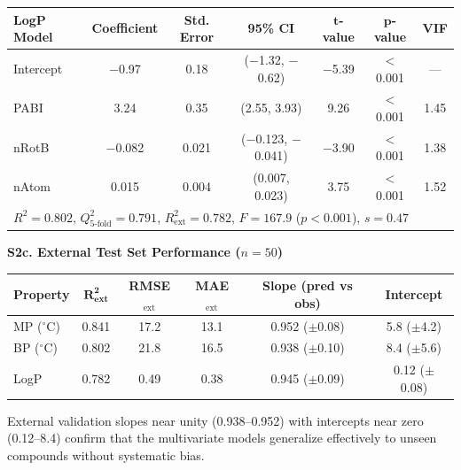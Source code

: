 \documentclass[12pt,a4paper]{article}
\begin{document}
\begin{table}[H]
\centering
\begin{tabular}{@{}lcccccc@{}}
\toprule
\textbf{LogP Model} & \textbf{Coefficient} & \textbf{Std. Error} & \textbf{95\% CI} & $\mathbf{t}$-\textbf{value} & $\mathbf{p}$-\textbf{value} & \textbf{VIF} \\
\midrule
Intercept & $-$0.97 & 0.18 & ($-$1.32, $-$0.62) & $-$5.39 & $<$0.001 & --- \\
PABI & 3.24 & 0.35 & (2.55, 3.93) & 9.26 & $<$0.001 & 1.45 \\
nRotB & $-$0.082 & 0.021 & ($-$0.123, $-$0.041) & $-$3.90 & $<$0.001 & 1.38 \\
nAtom & 0.015 & 0.004 & (0.007, 0.023) & 3.75 & $<$0.001 & 1.52 \\
\midrule
\multicolumn{7}{l}{$R^2 = 0.802$, $Q^2_{5\text{-fold}} = 0.791$, $R^2_{\text{ext}} = 0.782$, $F = 167.9$ ($p < 0.001$), $s = 0.47$} \\
\bottomrule
\end{tabular}
\end{table}

\vspace{0.5cm}

\noindent\textbf{S2c. External Test Set Performance ($n = 50$)}

\vspace{0.3cm}

\begin{table}[H]
\centering
\begin{tabular}{@{}lccccc@{}}
\toprule
\textbf{Property} & $\mathbf{R^2_{\text{ext}}}$ & \textbf{RMSE$_{\text{ext}}$} & \textbf{MAE$_{\text{ext}}$} & \textbf{Slope (pred vs obs)} & \textbf{Intercept} \\
\midrule
MP ($^{\circ}$C) & 0.841 & 17.2 & 13.1 & 0.952 ($\pm$0.08) & 5.8 ($\pm$4.2) \\
BP ($^{\circ}$C) & 0.802 & 21.8 & 16.5 & 0.938 ($\pm$0.10) & 8.4 ($\pm$5.6) \\
LogP & 0.782 & 0.49 & 0.38 & 0.945 ($\pm$0.09) & 0.12 ($\pm$0.08) \\
\bottomrule
\end{tabular}
\end{table}

\noindent External validation slopes near unity (0.938--0.952) with intercepts near zero (0.12--8.4) confirm that the multivariate models generalize effectively to unseen compounds without systematic bias.

\newpage
\end{document}
